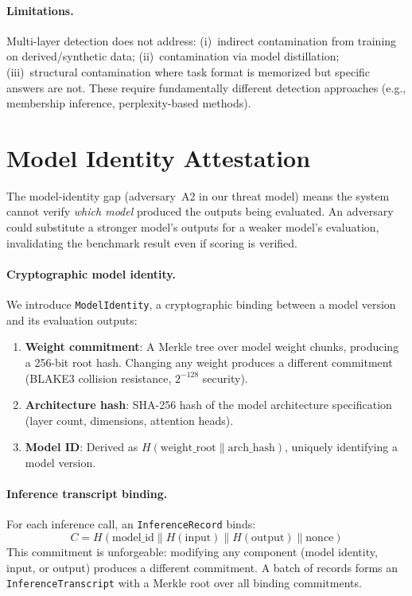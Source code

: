 \documentclass[11pt]{article}
\begin{document}
\paragraph{Limitations.}
Multi-layer detection does not address: (i)~indirect contamination
from training on derived/synthetic data; (ii)~contamination via
model distillation; (iii)~structural contamination where task format
is memorized but specific answers are not.  These require
fundamentally different detection approaches (e.g., membership
inference, perplexity-based methods).


\section{Model Identity Attestation}\label{sec:model-identity}

The model-identity gap (adversary~A2 in our threat model) means the
system cannot verify \emph{which model} produced the outputs being
evaluated.  An adversary could substitute a stronger model's outputs
for a weaker model's evaluation, invalidating the benchmark result
even if scoring is verified.

\paragraph{Cryptographic model identity.}
We introduce \texttt{ModelIdentity}, a cryptographic binding between
a model version and its evaluation outputs:
\begin{enumerate}[nosep]
\item \textbf{Weight commitment}: A Merkle tree over model weight
  chunks, producing a 256-bit root hash.  Changing any weight
  produces a different commitment (BLAKE3 collision resistance,
  $2^{-128}$ security).
\item \textbf{Architecture hash}: SHA-256 hash of the model
  architecture specification (layer count, dimensions, attention heads).
\item \textbf{Model ID}: Derived as $H(\text{weight\_root} \|
  \text{arch\_hash})$, uniquely identifying a model version.
\end{enumerate}

\paragraph{Inference transcript binding.}
For each inference call, an \texttt{InferenceRecord} binds:
\[
  C = H(\text{model\_id} \| H(\text{input}) \| H(\text{output}) \| \text{nonce})
\]
This commitment is unforgeable: modifying any component
(model identity, input, or output) produces a different commitment.
A batch of records forms an \texttt{InferenceTranscript} with a
Merkle root over all binding commitments.
\end{document}
